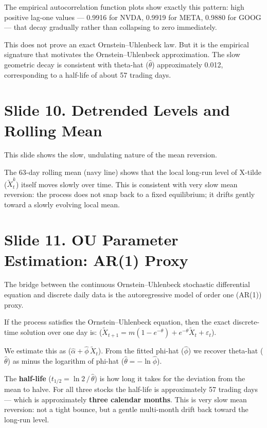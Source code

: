 \documentclass[12pt,a4paper]{article}
\begin{document}
The empirical autocorrelation function plots show exactly this pattern:
high positive lag-one values ---
0.9916 for NVDA, 0.9919 for META, 0.9880 for GOOG ---
that decay gradually rather than collapsing to zero immediately.

This does not prove an exact Ornstein--Uhlenbeck law.
But it is the empirical signature that motivates the Ornstein--Uhlenbeck approximation.
The slow geometric decay is consistent with theta-hat ($\hat\theta$) approximately 0.012,
corresponding to a half-life of about 57 trading days.

\section{Slide 10. Detrended Levels and Rolling Mean}

This slide shows the slow, undulating nature of the mean reversion.

The 63-day rolling mean (navy line) shows that the local long-run level of
X-tilde ($\widetilde{X}_t^k$) itself moves slowly over time.
This is consistent with very slow mean reversion:
the process does not snap back to a fixed equilibrium;
it drifts gently toward a slowly evolving local mean.

\section{Slide 11. OU Parameter Estimation: AR(1) Proxy}

The bridge between the continuous Ornstein--Uhlenbeck stochastic differential equation
and discrete daily data is the autoregressive model of order one (AR(1)) proxy.

If the process satisfies the Ornstein--Uhlenbeck equation, then the exact
discrete-time solution over one day is:
($\widetilde{X}_{t+1} = m(1-e^{-\theta}) + e^{-\theta}\widetilde{X}_t + \varepsilon_t$).

We estimate this as ($\hat\alpha + \hat\phi\,\widetilde{X}_t$).
From the fitted phi-hat ($\hat\phi$)
we recover theta-hat ($\hat\theta$) as minus the logarithm of phi-hat
($\hat\theta = -\ln\hat\phi$).

The \textbf{half-life} ($t_{1/2} = \ln 2\,/\,\hat\theta$)
is how long it takes for the deviation from the mean to halve.
For all three stocks the half-life is approximately 57 trading days ---
which is approximately \textbf{three calendar months}.
This is very slow mean reversion:
not a tight bounce, but a gentle multi-month drift back toward the long-run level.
\end{document}

